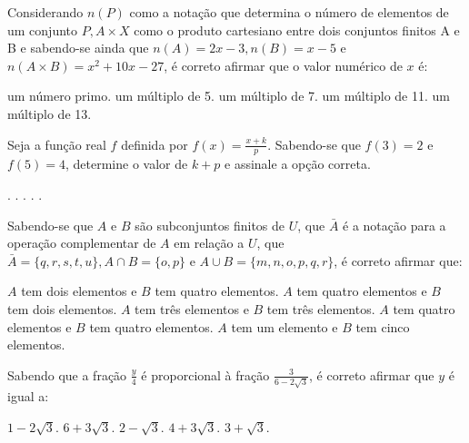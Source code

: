 \begin{question}%
Considerando \(n(P)\) como a notação que determina o número de elementos de um conjunto \(P,A \times X\) como o produto cartesiano entre dois conjuntos finitos A e B e sabendo-se ainda que \(n(A) = 2x - 3, n(B) = x-5\) e \(n(A \times B)= x^2 +10x -27\), é correto afirmar que o valor numérico de \(x\) é:
    \begin{tasks}
        \task um número primo.
        \task um múltiplo de 5.
        \task um múltiplo de 7.
        \task um múltiplo de 11.
        \task um múltiplo de 13.
    \end{tasks}
\end{question}

\begin{question}%
Seja a função real \(f\) definida por \(f(x) = \frac{x+k}{p}\). Sabendo-se que \(f(3) = 2\) e \(f(5) = 4\), determine o valor de \(k+p\) e assinale a opção correta.
    \begin{tasks}
        .
        .
        .
        .
        .
    \end{tasks}
\end{question}

\begin{question}%
Sabendo-se que \(A\) e \(B\) são subconjuntos finitos de \(U\), que \( \bar{A}\) é a notação para a operação complementar de \(A\) em relação a \(U\), que \(\bar{A} = \{q,r,s,t,u\}, A \cap B = \{o,p\}\) e \(A \cup B = \{m,n,o,p,q,r\}\), é correto afirmar que:
    \begin{tasks}
        \task \(A\) tem dois elementos e \(B\) tem quatro elementos.
        \task \(A\) tem quatro elementos e \(B\) tem dois elementos.
        \task \(A\) tem três elementos e \(B\) tem três elementos.
        \task \(A\) tem quatro elementos e \(B\) tem quatro elementos.
        \task \(A\) tem um elemento e \(B\) tem cinco elementos.
    \end{tasks}
\end{question}

\begin{question}%
Sabendo que a fração \(\frac{y}{4}\) é proporcional à fração \(\frac{3}{6-2\sqrt{3}}\), é correto afirmar que \(y\) é igual a:
    \begin{tasks}
        \task \( 1 - 2\sqrt{3}\).
        \task \( 6 + 3\sqrt{3}\).
        \task \( 2 - \sqrt{3}\).
        \task \( 4 + 3\sqrt{3}\).
        \task \( 3+ \sqrt{3}\).
    \end{tasks}
\end{question}

